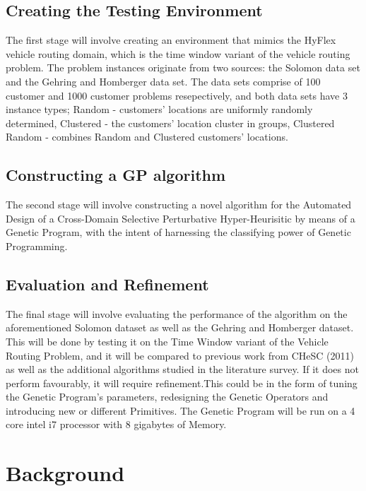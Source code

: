 \documentclass[a4paper,12pt]{article}
\begin{document}
    \subsection{Creating the Testing Environment}
    \par{The first stage will involve creating an environment that mimics the HyFlex vehicle routing domain, which is the time window variant of the vehicle routing problem. The problem instances originate from two sources: the Solomon data set and the Gehring and Homberger data set. The data sets comprise of 100 customer and 1000 customer problems resepectively, and both data sets have 3 instance types; Random - customers' locations are uniformly randomly determined, Clustered - the customers' location cluster in groups, Clustered Random - combines Random and Clustered customers' locations.} 
    \subsection{Constructing a GP algorithm}
    \par{The second stage will involve constructing a novel algorithm for the Automated Design of a Cross-Domain Selective Perturbative Hyper-Heurisitic by means of a Genetic Program, with the intent of harnessing the classifying power of Genetic Programming. }
    \subsection{Evaluation and Refinement}
    \par{The final stage will involve evaluating the performance of the algorithm on the aforementioned Solomon dataset as well as the Gehring and Homberger dataset. This will be done by testing it on the Time Window variant of the Vehicle Routing Problem, and it will be compared to previous work from CHeSC (2011) as well as the additional algorithms studied in the literature survey. If it does not perform favourably, it will require refinement.This could be in the form of tuning the Genetic Program's parameters, redesigning the Genetic Operators and introducing new or different Primitives.\newline
    \newline
    The Genetic Program will be run on a 4 core intel i7 processor with 8 gigabytes of Memory.}

\section{Background}
\end{document}
